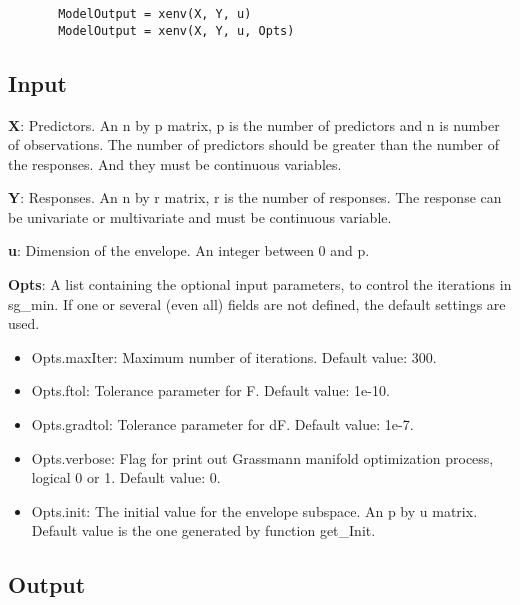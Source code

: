 \documentclass[a4paper,11pt,openany]{memoir}
\begin{document}
\begin{verbatim}       ModelOutput = xenv(X, Y, u)
       ModelOutput = xenv(X, Y, u, Opts)\end{verbatim}
    

\subsection*{Input}

\begin{par}
\textbf{X}: Predictors. An n by p matrix, p is the number of predictors and n is number of observations. The number of predictors should be greater than the number of the responses. And they must be continuous variables.
\end{par} \vspace{1em}
\begin{par}
\textbf{Y}: Responses. An n by r matrix, r is the number of responses. The response can be univariate or multivariate and must be continuous variable.
\end{par} \vspace{1em}
\begin{par}
\textbf{u}: Dimension of the envelope. An integer between 0 and p.
\end{par} \vspace{1em}
\begin{par}
\textbf{Opts}: A list containing the optional input parameters, to control the iterations in sg\_min. If one or several (even all) fields are not defined, the default settings are used.
\end{par} \vspace{1em}
\begin{itemize}
\setlength{\itemsep}{-1ex}
   \item Opts.maxIter: Maximum number of iterations.  Default value: 300.
   \item Opts.ftol: Tolerance parameter for F.  Default value: 1e-10.
   \item Opts.gradtol: Tolerance parameter for dF.  Default value: 1e-7.
   \item Opts.verbose: Flag for print out Grassmann manifold optimization process, logical 0 or 1. Default value: 0.
      \item Opts.init: The initial value for the envelope subspace. An p by u matrix. Default value is the one generated by function get\_Init.
\end{itemize}


\subsection*{Output}
\end{document}
